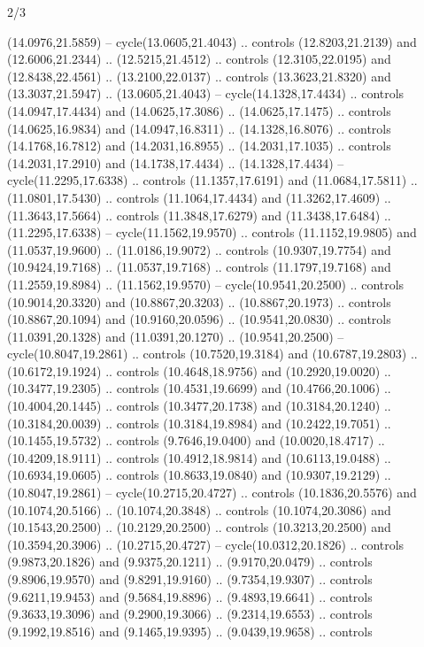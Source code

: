 \begin{flagdescription}{2/3}
\begin{scope}[yshift=\flagwidth,scale=\flagwidth/1241.93737]
\begin{scope}[y=-1mm, x=1mm,draw=gold,fill=blue,line join=miter,miter limit=4,line width=1.8\lw]
{  (14.0976,21.5859) -- cycle(13.0605,21.4043) .. controls (12.8203,21.2139) and
  (12.6006,21.2344) .. (12.5215,21.4512) .. controls (12.3105,22.0195) and
  (12.8438,22.4561) .. (13.2100,22.0137) .. controls (13.3623,21.8320) and
  (13.3037,21.5947) .. (13.0605,21.4043) -- cycle(14.1328,17.4434) .. controls
  (14.0947,17.4434) and (14.0625,17.3086) .. (14.0625,17.1475) .. controls
  (14.0625,16.9834) and (14.0947,16.8311) .. (14.1328,16.8076) .. controls
  (14.1768,16.7812) and (14.2031,16.8955) .. (14.2031,17.1035) .. controls
  (14.2031,17.2910) and (14.1738,17.4434) .. (14.1328,17.4434) --
  cycle(11.2295,17.6338) .. controls (11.1357,17.6191) and (11.0684,17.5811) ..
  (11.0801,17.5430) .. controls (11.1064,17.4434) and (11.3262,17.4609) ..
  (11.3643,17.5664) .. controls (11.3848,17.6279) and (11.3438,17.6484) ..
  (11.2295,17.6338) -- cycle(11.1562,19.9570) .. controls (11.1152,19.9805) and
  (11.0537,19.9600) .. (11.0186,19.9072) .. controls (10.9307,19.7754) and
  (10.9424,19.7168) .. (11.0537,19.7168) .. controls (11.1797,19.7168) and
  (11.2559,19.8984) .. (11.1562,19.9570) -- cycle(10.9541,20.2500) .. controls
  (10.9014,20.3320) and (10.8867,20.3203) .. (10.8867,20.1973) .. controls
  (10.8867,20.1094) and (10.9160,20.0596) .. (10.9541,20.0830) .. controls
  (11.0391,20.1328) and (11.0391,20.1270) .. (10.9541,20.2500) --
  cycle(10.8047,19.2861) .. controls (10.7520,19.3184) and (10.6787,19.2803) ..
  (10.6172,19.1924) .. controls (10.4648,18.9756) and (10.2920,19.0020) ..
  (10.3477,19.2305) .. controls (10.4531,19.6699) and (10.4766,20.1006) ..
  (10.4004,20.1445) .. controls (10.3477,20.1738) and (10.3184,20.1240) ..
  (10.3184,20.0039) .. controls (10.3184,19.8984) and (10.2422,19.7051) ..
  (10.1455,19.5732) .. controls (9.7646,19.0400) and (10.0020,18.4717) ..
  (10.4209,18.9111) .. controls (10.4912,18.9814) and (10.6113,19.0488) ..
  (10.6934,19.0605) .. controls (10.8633,19.0840) and (10.9307,19.2129) ..
  (10.8047,19.2861) -- cycle(10.2715,20.4727) .. controls (10.1836,20.5576) and
  (10.1074,20.5166) .. (10.1074,20.3848) .. controls (10.1074,20.3086) and
  (10.1543,20.2500) .. (10.2129,20.2500) .. controls (10.3213,20.2500) and
  (10.3594,20.3906) .. (10.2715,20.4727) -- cycle(10.0312,20.1826) .. controls
  (9.9873,20.1826) and (9.9375,20.1211) .. (9.9170,20.0479) .. controls
  (9.8906,19.9570) and (9.8291,19.9160) .. (9.7354,19.9307) .. controls
  (9.6211,19.9453) and (9.5684,19.8896) .. (9.4893,19.6641) .. controls
  (9.3633,19.3096) and (9.2900,19.3066) .. (9.2314,19.6553) .. controls
  (9.1992,19.8516) and (9.1465,19.9395) .. (9.0439,19.9658) .. controls
}
\end{scope}
\end{scope}
\end{flagdescription}
